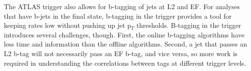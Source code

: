 The ATLAS trigger also allows for b-tagging of jets at L2 and EF.  For analyses that have b-jets in the final state, b-tagging in the trigger provides a tool for keeping rates low without pushing up jet p$_T$ thresholds.  B-tagging in the trigger introduces several challenges, though.  First, the online b-tagging algorithms have less time and information than the offline algorithms.  Second, a jet that passes an L2 b-tag will not necessarily pass an EF b-tag, and vice versa, so more work is required in understanding the correlations between tags at different trigger levels.  







